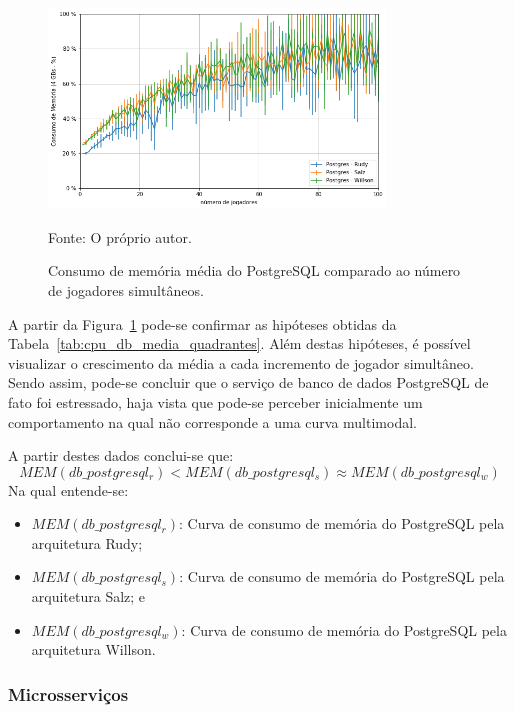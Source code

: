 \begin{figure}[htb!]
  \caption{Consumo de memória média do PostgreSQL comparado ao número de jogadores simultâneos.}
  \label{fig:mem_db_media_por_jogador}
  \includegraphics[width=0.8\textwidth]{figuras/analise/mem_db_media_por_jogador.png}
  \centering

  Fonte: O próprio autor.
\end{figure}

A partir da Figura~\ref{fig:mem_db_media_por_jogador} pode-se confirmar as hipóteses obtidas da Tabela~\ref{tab:cpu_db_media_quadrantes}.
%
Além destas hipóteses, é possível visualizar o crescimento da média a cada incremento de jogador simultâneo.
%
Sendo assim, pode-se concluir que o serviço de banco de dados PostgreSQL de fato foi estressado, haja vista que pode-se perceber inicialmente um comportamento na qual não corresponde a uma curva multimodal.

A partir destes dados conclui-se que:
\vspace{-0.3cm}
$$
    MEM(db\_postgresql_{r}) < MEM(db\_postgresql_{s}) \approx MEM(db\_postgresql_{w})
$$
\vspace{-0.3cm}
Na qual entende-se:
\vspace{-0.3cm}
\begin{itemize}
\item $MEM(db\_postgresql_{r})$: Curva de consumo de memória do PostgreSQL pela arquitetura Rudy;
\vspace{-0.3cm}
\item $MEM(db\_postgresql_{s})$: Curva de consumo de memória do PostgreSQL pela arquitetura Salz; e
\vspace{-0.3cm}
\item $MEM(db\_postgresql_{w})$: Curva de consumo de memória do PostgreSQL pela arquitetura Willson.
\end{itemize}


\subsubsection{Microsserviços}

